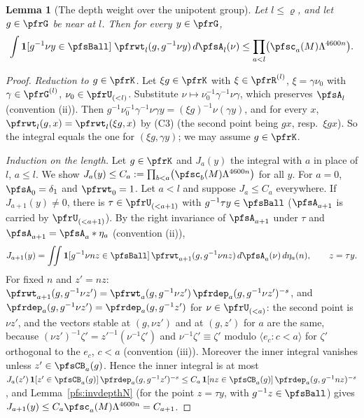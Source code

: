\documentclass[10pt]{amsart}
\newtheorem{lemma}[theorem]{Lemma}
\theoremstyle{definition}
\theoremstyle{remark}
\begin{document}
\begin{lemma}[The depth weight over the unipotent group]\label{pfs:depthweight}
Let $l\le\varrho$, and let $g\in\pfrG$ be near at $l$. Then for every $y\in\pfrG$,
\[
\int\mathbf 1[g^{-1}\nu y\in\pfsBall]\;\pfrwt_l(g,g^{-1}\nu y)\,d\pfsA_l(\nu)\le\prod_{a<l}\bigl(\pfsc_a(M)\Lambda^{4600n}\bigr).
\]
\end{lemma}
\begin{proof}
\emph{Reduction to $g\in\pfrK$.} Let $\xi g\in\pfrK$ with $\xi\in\pfrR^{(l)}$, $\xi=\gamma\nu_0$ with $\gamma\in\pfrG^{(l)}$,
$\nu_0\in\pfrU_{(<l)}$. Substitute $\nu\mapsto\nu_0^{-1}\gamma^{-1}\nu\gamma$, which preserves $\pfsA_l$ (convention (ii)). Then
$g^{-1}\nu_0^{-1}\gamma^{-1}\nu\gamma y=(\xi g)^{-1}\nu(\gamma y)$, and for every $x$, $\pfrwt_l(g,x)=\pfrwt_l(\xi g,x)$ by (C3)
(the second point being $gx$, resp.\ $\xi gx$). So the integral equals the one for $(\xi g,\gamma y)$; we may assume
$g\in\pfrK$.

\emph{Induction on the length.} Let $g\in\pfrK$ and $J_a(y)$ the integral with $a$ in place of $l$, $a\le l$. We show
$J_a(y)\le C_a:=\prod_{b<a}\bigl(\pfsc_b(M)\Lambda^{4600n}\bigr)$ for all $y$. For $a=0$, $\pfsA_0=\delta_1$ and $\pfrwt_0=1$. Let $a<l$ and
suppose $J_a\le C_a$ everywhere. If $J_{a+1}(y)\ne0$, there is $\tau\in\pfrU_{(<a+1)}$ with $g^{-1}\tau y\in\pfsBall$
($\pfsA_{a+1}$ is carried by $\pfrU_{(<a+1)}$). By the right invariance of $\pfsA_{a+1}$ under $\tau$ and
$\pfsA_{a+1}=\pfsA_a*\eta_a$ (convention (ii)),
\[
J_{a+1}(y)=\iint\mathbf 1[g^{-1}\nu nz\in\pfsBall]\,\pfrwt_{a+1}(g,g^{-1}\nu nz)\,d\pfsA_a(\nu)\,d\eta_a(n),\qquad z=\tau y .
\]
For fixed $n$ and $z'=nz$: $\pfrwt_{a+1}(g,g^{-1}\nu z')=\pfrwt_a(g,g^{-1}\nu z')\,\pfrdep_a(g,g^{-1}\nu z')^{-s}$, and
$\pfrdep_a(g,g^{-1}\nu z')=\pfrdep_a(g,g^{-1}z')$ for $\nu\in\pfrU_{(<a)}$: the second point is $\nu z'$, and the vectors
stable at $(g,\nu z')$ and at $(g,z')$ for $a$ are the same, because $(\nu z')^{-1}\zeta'=z'^{-1}(\nu^{-1}\zeta')$ and
$\nu^{-1}\zeta'\equiv\zeta'$ modulo $\langle e_c:c<a\rangle$ for $\zeta'$ orthogonal to the $e_c$, $c<a$ (convention (iii)). Moreover
the inner integral vanishes unless $z'\in\pfsCB_a(g)$. Hence the inner integral is at most
$J_a(z')\,\mathbf 1[z'\in\pfsCB_a(g)]\,\pfrdep_a(g,g^{-1}z')^{-s}\le C_a\,\mathbf 1[nz\in\pfsCB_a(g)]\,\pfrdep_a(g,g^{-1}nz)^{-s}$,
and Lemma~\ref{pfs:invdepthN} (for the point $z=\tau y$, with $g^{-1}z\in\pfsBall$) gives $J_{a+1}(y)\le C_a\pfsc_a(M)
\Lambda^{4600n}=C_{a+1}$.
\end{proof}
\end{document}
